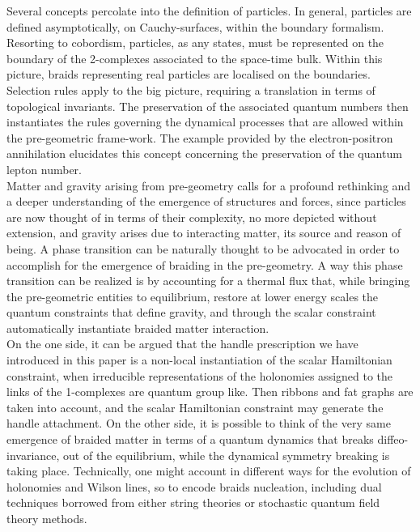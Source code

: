 \documentclass[aps,nofootinbib,amsfonts,superscriptaddress]{revtex4}
\begin{document}
Several concepts percolate into the definition of particles. In general, particles are defined asymptotically, on Cauchy-surfaces, within the boundary formalism. Resorting to cobordism, particles, as any states, must be represented on the boundary of the 2-complexes associated to the space-time bulk. Within this picture, braids representing real particles are localised on the boundaries. Selection rules apply to the big picture, requiring a translation in terms of topological invariants. The preservation of the associated quantum numbers then instantiates the rules governing the dynamical processes that are allowed within the pre-geometric frame-work. The example provided by the electron-positron annihilation elucidates this concept concerning the preservation of the quantum lepton number. \\  

Matter and gravity arising from pre-geometry calls for a profound rethinking and a deeper understanding of the emergence of structures and forces, since particles are now thought of in terms of their complexity, no more depicted without extension, and gravity arises due to interacting matter, its source and reason of being. A phase transition can be naturally thought to be advocated in order to accomplish for the emergence of braiding in the pre-geometry. A way this phase transition can be realized is by accounting for a thermal flux that, while bringing the pre-geometric entities to equilibrium, restore at lower energy scales the quantum constraints that define gravity, and through the scalar constraint automatically instantiate braided matter interaction. \\

On the one side, it can be argued that the handle prescription we have introduced in this paper is a non-local instantiation of the scalar Hamiltonian constraint, when irreducible representations of the holonomies assigned to the links of the 1-complexes are quantum group like. Then ribbons and fat graphs are taken into account, and the scalar Hamiltonian constraint may generate the handle attachment. On the other side, it is possible to think of the very same emergence of braided matter in terms of a quantum dynamics that breaks diffeo-invariance, out of the equilibrium, while the dynamical symmetry breaking is taking place. Technically, one might account in different ways for the evolution of holonomies and Wilson lines, so to encode braids nucleation, including dual techniques borrowed from either string theories or stochastic quantum field theory methods. \\      
\end{document}
